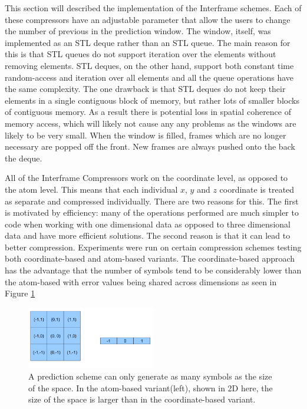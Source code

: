 \documentclass[a4paper,11pt]{report}
\begin{document}
This section will described the implementation of the Interframe schemes. Each of these compressors have an adjustable parameter that allow the users to change the number of previous in the prediction window. The window, itself, was implemented as an STL deque rather than an STL queue. The main reason for this is that STL queues do not support iteration over the elements without removing elements. STL deques, on the other hand, support both constant time random-access and iteration over all elements and all the queue operations have the same complexity. The one drawback is that STL deques do not keep their elements in a single contiguous block of memory, but rather lots of smaller blocks of contiguous memory. As a result there is potential loss in spatial coherence of memory access, which will likely not cause any any problems as the windows are likely to be very small. When the window is filled, frames which are no longer necessary are popped off the front. New frames are always pushed onto the back the deque.

All of the Interframe Compressors work on the coordinate level, as opposed to the atom level. This means that each individual $x$, $y$ and $z$ coordinate is treated as separate and compressed individually. There are two reasons for this. The first is motivated by efficiency: many of the operations performed are much simpler to code when working with one dimensional data as opposed to three dimensional data and have more efficient solutions. The second reason is that it can lead to better compression. Experiments were run on certain compression schemes testing both coordinate-based and atom-based variants. The coordinate-based approach has the advantage that the number of symbols tend to be considerably lower than the atom-based with error values being shared across dimensions as seen in Figure \ref{High}

\begin{figure}
 \center
 \includegraphics[width=0.5\textwidth]{resources/HigherSymbols.png}
\caption{A prediction scheme can only generate as many symbols as the size of the space. In the atom-based variant(left), shown in 2D here, the size of the space is larger than in the coordinate-based variant. }
\label{High}
\end{figure}
\end{document}
